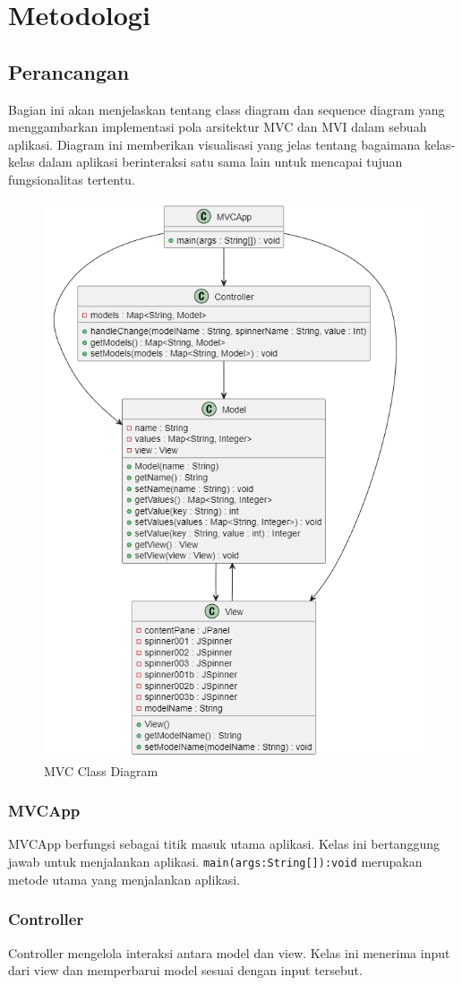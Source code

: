 \documentclass[conference]{IEEEtran}
\begin{document}
\setcounter{subsubsection}{0}
\section{Metodologi}
\subsection{Perancangan}
Bagian ini akan menjelaskan tentang class diagram dan sequence diagram yang menggambarkan implementasi pola arsitektur MVC dan MVI dalam sebuah aplikasi. Diagram ini memberikan visualisasi yang jelas tentang bagaimana kelas-kelas dalam aplikasi berinteraksi satu sama lain untuk mencapai tujuan fungsionalitas tertentu.

\begin{figure}[h]
    \centering
    \includegraphics[width=0.6\linewidth]{MVCClassDiagram.png}
    \caption{MVC Class Diagram}
    \label{fig:enter-label}
\end{figure}

\subsubsection{MVCApp}
MVCApp berfungsi sebagai titik masuk utama aplikasi. Kelas ini bertanggung jawab untuk menjalankan aplikasi. \verb |main(args:String[]):void| merupakan metode utama yang menjalankan aplikasi. \\

\subsubsection{Controller}
Controller mengelola interaksi antara model dan view. Kelas ini menerima input dari view dan memperbarui model sesuai dengan input tersebut. 
\end{document}

